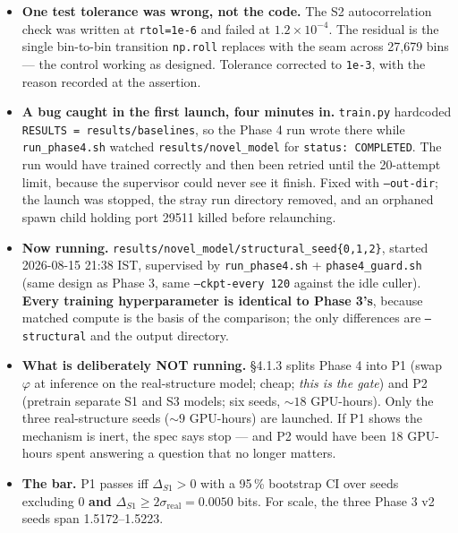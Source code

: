 \documentclass[11pt,a4paper]{article}
\newcommand{\code}[1]{\texttt{\small #1}}
\begin{document}
\begin{itemize}
S2 preserves local autocorrelation while S1 destroys it (successive-difference
sd $0.2608 \rightarrow 1.2471$), that $\varphi$ arrives as
$(b, 32768, 8)$ float32 with invalid positions exactly zero, that gradient
reaches both the encoder and \code{W\_dstruct}, that \code{DeltaCapture} sees the
structural contribution, and --- CLAUDE.md's Phase 4 gate --- that \textbf{shuffling
$\varphi$ changes the output} once \code{W\_dstruct} is non-zero, while at
initialisation it provably does \emph{not} (zero-init equivalence). \code{test\_model.py}
still passes 17/17.
\item \textbf{One test tolerance was wrong, not the code.} The S2
autocorrelation check was written at \code{rtol=1e-6} and failed at
$1.2\times10^{-4}$. The residual is the single bin-to-bin transition
\code{np.roll} replaces with the seam across 27{,}679 bins --- the control
working as designed. Tolerance corrected to \code{1e-3}, with the reason
recorded at the assertion.
\item \textbf{A bug caught in the first launch, four minutes in.}
\code{train.py} hardcoded \code{RESULTS = results/baselines}, so the Phase 4 run
wrote there while \code{run\_phase4.sh} watched \code{results/novel\_model} for
\code{status: COMPLETED}. The run would have trained correctly and then been
retried until the 20-attempt limit, because the supervisor could never see it
finish. Fixed with \code{--out-dir}; the launch was stopped, the stray run
directory removed, and an orphaned spawn child holding port 29511 killed before
relaunching.
\item \textbf{Now running.} \code{results/novel\_model/structural\_seed\{0,1,2\}},
started 2026-08-15 21:38 IST, supervised by \code{run\_phase4.sh} +
\code{phase4\_guard.sh} (same design as Phase 3, same
\code{--ckpt-every 120} against the idle culler). \textbf{Every training
hyperparameter is identical to Phase 3's}, because matched compute is the basis
of the comparison; the only differences are \code{--structural} and the output
directory.
\item \textbf{What is deliberately NOT running.} \S4.1.3 splits Phase 4 into P1
(swap $\varphi$ at inference on the real-structure model; cheap; \emph{this is
the gate}) and P2 (pretrain separate S1 and S3 models; six seeds,
${\sim}18$ GPU-hours). Only the three real-structure seeds
(${\sim}9$ GPU-hours) are launched. If P1 shows the mechanism is inert, the spec
says stop --- and P2 would have been 18 GPU-hours spent answering a question that
no longer matters.
\item \textbf{The bar.} P1 passes iff $\Delta_{S1} > 0$ with a 95\,\% bootstrap
CI over seeds excluding 0 \textbf{and} $\Delta_{S1} \ge 2\sigma_{\mathrm{real}} =
\mathbf{0.0050}$ bits. For scale, the three Phase 3 v2 seeds span 1.5172--1.5223.
\end{itemize}
\end{document}
